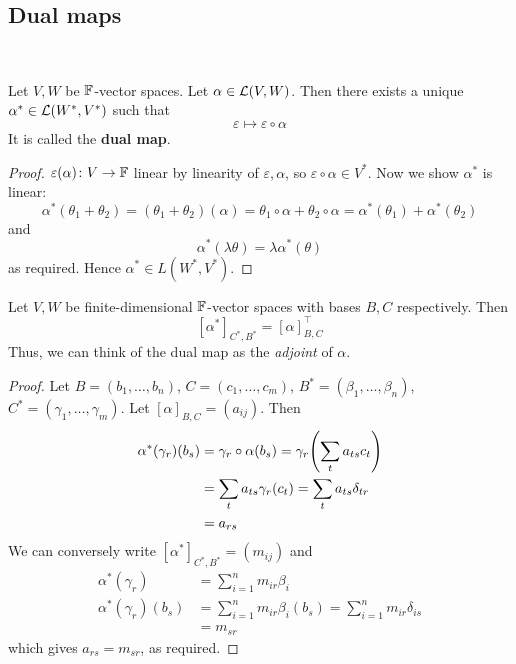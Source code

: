 \documentclass[a4paper,11pt]{article}
\begin{document}
\subsection{Dual maps}\ \vspace{-1.5em}
\begin{lemma}
	Let $ V, W $ be $ {\mathbb{F}} $-vector spaces.
	Let $ \alpha \in {\mathcal{L}}(V,W) $.
	Then there exists a unique $ \alpha^* \in {\mathcal{L}}(W^*, V^*) $ such that
	\[
		\varepsilon \mapsto \varepsilon \circ \alpha
	\]
	It is called the \textbf{dual map}.
\end{lemma}
\begin{proof}
	$ \varepsilon(\alpha) \colon V \to {\mathbb{F}} $ linear by linearity of $ \varepsilon, \alpha $,	so $ \varepsilon \circ \alpha \in V^* $.
	Now we show $ \alpha^* $ is linear:
	\[
		\alpha^*(\theta_1 + \theta_2) = (\theta_1 + \theta_2)(\alpha) = \theta_1 \circ \alpha + \theta_2 \circ \alpha = \alpha^*(\theta_1) + \alpha^*(\theta_2)
	\]
	and
	\[
		\alpha^*(\lambda \theta) = \lambda \alpha^*(\theta)
	\]
	as required.
	Hence $ \alpha^* \in L(W^*, V^*) $.
\end{proof}
\begin{proposition}
	Let $ V, W $ be finite-dimensional $ {\mathbb{F}} $-vector spaces with bases $ B, C $ respectively.
	Then
	\[
		[\alpha^*]_{C^*, B^*} = [\alpha]^\top_{B, C}
	\]
	Thus, we can think of the dual map as the \textit{adjoint} of $ \alpha $.
\end{proposition}
\begin{proof}
	Let $ B = (b_1, \dots, b_n) $, $ C = (c_1, \dots, c_m) $, $ B^* = (\beta_1, \dots, \beta_n) $, $ C^* = (\gamma_1, \dots, \gamma_m) $.
	Let $ [\alpha]_{B,C} = (a_{ij}) $.
	Then
	\begin{align*}
		\alpha^*(\gamma_r)(b_s) & = \gamma_r \circ \alpha(b_s)= \gamma_r \qty( \sum_t a_{ts} c_t ) \\
		                            & = \sum_t a_{ts} \gamma_r(c_t) = \sum_t a_{ts} \delta_{tr}          \\
		                            & = a_{rs}
	\end{align*}
	We can conversely write $ [\alpha^*]_{C^*, B^*} = (m_{ij}) $ and
	\begin{align*}
		\alpha^*(\gamma_r)      & = \sum_{i=1}^n m_{ir} \beta_i      \\
		\alpha^*(\gamma_r)(b_s) & = \sum_{i=1}^n m_{ir} \beta_i(b_s)= \sum_{i=1}^n m_{ir} \delta_{is}  \\
		                            & = m_{sr}
	\end{align*}
	which gives $ a_{rs} = m_{sr} $, as required.
\end{proof}
\end{document}
